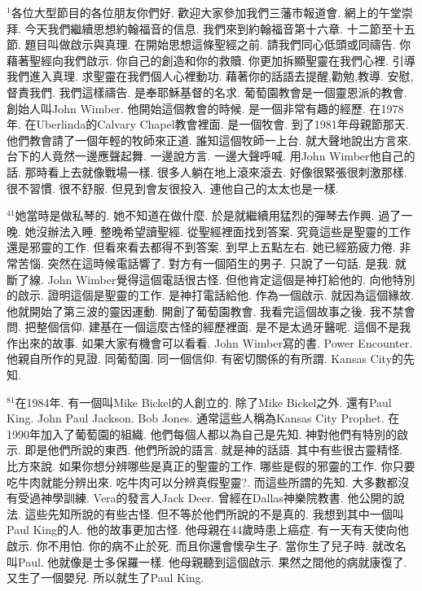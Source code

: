 \documentclass{book}
\begin{document}
$^{1}$各位大型節目的各位朋友你們好.
歡迎大家參加我們三藩市報道會.
網上的午堂崇拜.
今天我們繼續思想約翰福音的信息.
我們來到約翰福音第十六章.
十二節至十五節.
題目叫做啟示與真理.
在開始思想這條聖經之前.
請我們同心低頭或同禱告.
你藉著聖經向我們啟示.
你自己的創造和你的救贖.
你更加拆顯聖靈在我們心裡.
引導我們進入真理.
求聖靈在我們個人心裡動功.
藉著你的話語去提醒,勸勉,教導.
安慰,督責我們.
我們這樣禱告.
是奉耶穌基督的名求.
葡萄園教會是一個靈恩派的教會.
創始人叫John Wimber.
他開始這個教會的時候.
是一個非常有趣的經歷.
在1978年.
在Uberlinda的Calvary Chapel教會裡面.
是一個牧會.
到了1981年母親節那天.
他們教會請了一個年輕的牧師來正道.
誰知這個牧師一上台.
就大聲地說出方言來.
台下的人竟然一邊應聲起舞.
一邊說方言.
一邊大聲呼喊.
用John Wimber他自己的話.
那時看上去就像戰場一樣.
很多人躺在地上滾來滾去.
好像很緊張很刺激那樣.
很不習慣.
很不舒服.
但見到會友很投入.
連他自己的太太也是一樣.

$^{41}$她當時是做私琴的.
她不知道在做什麼.
於是就繼續用猛烈的彈琴去作興.
過了一晚.
她沒辦法入睡.
整晚希望讀聖經.
從聖經裡面找到答案.
究竟這些是聖靈的工作還是邪靈的工作.
但看來看去都得不到答案.
到早上五點左右.
她已經筋疲力倦.
非常苦惱.
突然在這時候電話響了.
對方有一個陌生的男子.
只說了一句話.
是我.
就斷了線.
John Wimber覺得這個電話很古怪.
但他肯定這個是神打給他的.
向他特別的啟示.
證明這個是聖靈的工作.
是神打電話給他.
作為一個啟示.
就因為這個緣故.
他就開始了第三波的靈因運動.
開創了葡萄園教會.
我看完這個故事之後.
我不禁會問.
把整個信仰.
建基在一個這麼古怪的經歷裡面.
是不是太過牙醫呢.
這個不是我作出來的故事.
如果大家有機會可以看看.
John Wimber寫的書.
Power Encounter.
他親自所作的見證.
同葡萄園.
同一個信仰.
有密切關係的有所謂.
Kansas City的先知.

$^{81}$在1984年.
有一個叫Mike Bickel的人創立的.
除了Mike Bickel之外.
還有Paul King.
John Paul Jackson.
Bob Jones.
通常這些人稱為Kansas City Prophet.
在1990年加入了葡萄園的組織.
他們每個人都以為自己是先知.
神對他們有特別的啟示.
即是他們所說的東西.
他們所說的語言.
就是神的話語.
其中有些很古靈精怪.
比方來說.
如果你想分辨哪些是真正的聖靈的工作.
哪些是假的邪靈的工作.
你只要吃牛肉就能分辨出來.
吃牛肉可以分辨真假聖靈?.
而這些所謂的先知.
大多數都沒有受過神學訓練.
Vera的發言人Jack Deer.
曾經在Dallas神樂院教書.
他公開的說法.
這些先知所說的有些古怪.
但不等於他們所說的不是真的.
我想到其中一個叫Paul King的人.
他的故事更加古怪.
他母親在44歲時患上癌症.
有一天有天使向他啟示.
你不用怕.
你的病不止於死.
而且你還會懷孕生子.
當你生了兒子時.
就改名叫Paul.
他就像是士多保羅一樣.
他母親聽到這個啟示.
果然之間他的病就康復了.
又生了一個嬰兒.
所以就生了Paul King.
\end{document}

